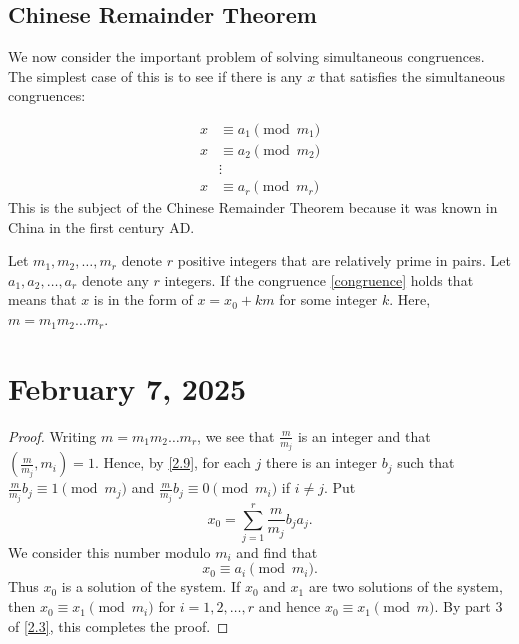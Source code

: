 \documentclass[11pt]{article}
\begin{document}
\subsection{Chinese Remainder Theorem}
We now consider the important problem of solving simultaneous congruences. The
simplest case of this is to see if there is any \(x\) that satisfies the
simultaneous congruences:

\[
    \begin{aligned}\label{congruence}
        x & \equiv a_1 \pmod{m_1} \\
        x & \equiv a_2 \pmod{m_2} \\
          & \vdots                \\
        x & \equiv a_r \pmod{m_r}
    \end{aligned}
\]
This is the subject of the Chinese Remainder Theorem because it was known in
China in the first century AD.

\begin{theorem}\label{2.18}
    Let \(m_1, m_2, \ldots, m_r\) denote \(r\) positive integers that are relatively prime in pairs. Let \(a_1, a_2, \ldots, a_r\) denote any \(r\) integers. If the congruence \ref{congruence} holds that means that \(x\) is in the form of \(x = x_0 + km\) for some integer \(k\). Here, \(m = m_1 m_2 \ldots m_r\).
\end{theorem}

\section{February 7, 2025}
\begin{proof}
    Writing \(m = m_1 m_2 \ldots m_r\), we see that \(\frac{m}{m_j}\) is an integer and that \(\left(\frac{m}{m_j}, m_i\right) = 1\). Hence, by \cref{2.9}, for each \(j\) there is an integer \(b_j\) such that \(\frac{m}{m_j} b_j \equiv 1 \pmod{m_j}\) and \(\frac{m}{m_j} b_j \equiv 0 \pmod{m_i}\) if \(i \neq j\). Put
    \[x_0 = \sum_{j=1}^{r} \frac{m}{m_j} b_j a_j.\]
    We consider this number modulo \(m_i\) and find that
    \[x_0 \equiv a_i \pmod{m_i}.\]
    Thus \(x_0\) is a solution of the system. If \(x_0\) and \(x_1\) are two
    solutions of the system, then \(x_0 \equiv x_1 \pmod{m_i}\) for \(i = 1, 2,
    \ldots, r\) and hence \(x_0 \equiv x_1 \pmod{m}\). By part 3 of \cref{2.3},
    this completes the proof.
\end{proof}
\end{document}
